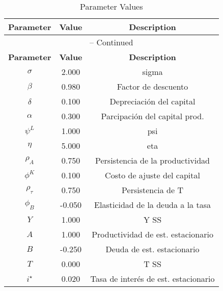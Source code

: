 \begin{center}
\begin{longtable}{ccc}
\caption{Parameter Values}\\%
\toprule%
\multicolumn{1}{c}{\textbf{Parameter}} &
\multicolumn{1}{c}{\textbf{Value}} &
 \multicolumn{1}{c}{\textbf{Description}}\\%
\midrule%
\endfirsthead
\multicolumn{3}{c}{{\tablename} \thetable{} -- Continued}\\%
\midrule%
\multicolumn{1}{c}{\textbf{Parameter}} &
\multicolumn{1}{c}{\textbf{Value}} &
  \multicolumn{1}{c}{\textbf{Description}}\\%
\midrule%
\endhead
$\sigma$ 	 & 	 2.000 	 & 	 sigma\\
$\beta$ 	 & 	 0.980 	 & 	 Factor de descuento\\
$\delta$ 	 & 	 0.100 	 & 	 Depreciación del capital\\
$\alpha$ 	 & 	 0.300 	 & 	 Parcipación del capital prod.\\
$\psi^L$ 	 & 	 1.000 	 & 	 psi\\
$\eta$ 	 & 	 5.000 	 & 	 eta\\
$\rho_{A}$ 	 & 	 0.750 	 & 	 Persistencia de la productividad\\
$\phi^{K}$ 	 & 	 0.100 	 & 	 Costo de ajuste del capital\\
$\rho_{\tau}$ 	 & 	 0.750 	 & 	 Persistencia de T\\
$\phi_{B}$ 	 & 	 -0.050 	 & 	 Elasticidad de la deuda a la tasa\\
$Y$ 	 & 	 1.000 	 & 	 Y SS\\
$A$ 	 & 	 1.000 	 & 	 Productividad de est. estacionario\\
$B$ 	 & 	 -0.250 	 & 	 Deuda de est. estacionario\\
$T$ 	 & 	 0.000 	 & 	 T SS\\
$i^{\star}$ 	 & 	 0.020 	 & 	 Tasa de interés de est. estacionario\\
\bottomrule%
\end{longtable}
\end{center}
